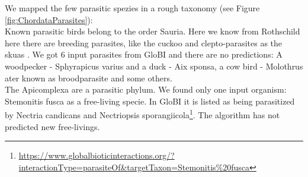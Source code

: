       We mapped the few parasitic spezies in a rough taxonomy (see Figure \ref{fig:ChordataParasites}): \\
      Known parasitic birds belong to the order Sauria. Here we know from Rothschild  here there are 
        breeding parasites, like the cuckoo and clepto-parasites as the skuas \cite{Rothschild1957}. We
        got 6 input parasites from GloBI and there are no predictions: A woodpecker - Sphyrapicus varius
        and a duck - Aix sponsa, a cow bird - Molothrus ater known as broodparasite and some others. \\

      The Apicomplexa are a parasitic phylum. We found only one input organism: Stemonitis fusca as a 
        free-living specie. In GloBI it is listed as being parasitized by Nectria candicans and Nectriopsis 
        sporangiicola\footnote{
          \hyperlink{https://www.globalbioticinteractions.org/?interactionType=parasiteOf&targetTaxon=Stemonitis\%20fusca}
          {https://www.globalbioticinteractions.org/?interactionType=parasiteOf\&targetTaxon=Stemonitis\%20fusca}
        }. The algorithm has not predicted new free-livings. \\

